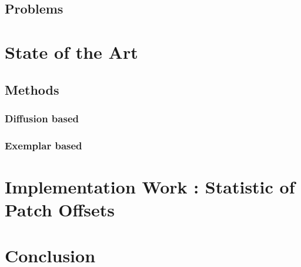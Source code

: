 \documentclass[12pt]{article}
\begin{document}
\subsection{Problems}

\section{State of the Art}
\subsection{Methods}
\subsubsection{Diffusion based}
\subsubsection{Exemplar based}

\section{Implementation Work : Statistic of Patch Offsets}

\section{Conclusion}
\end{document}
